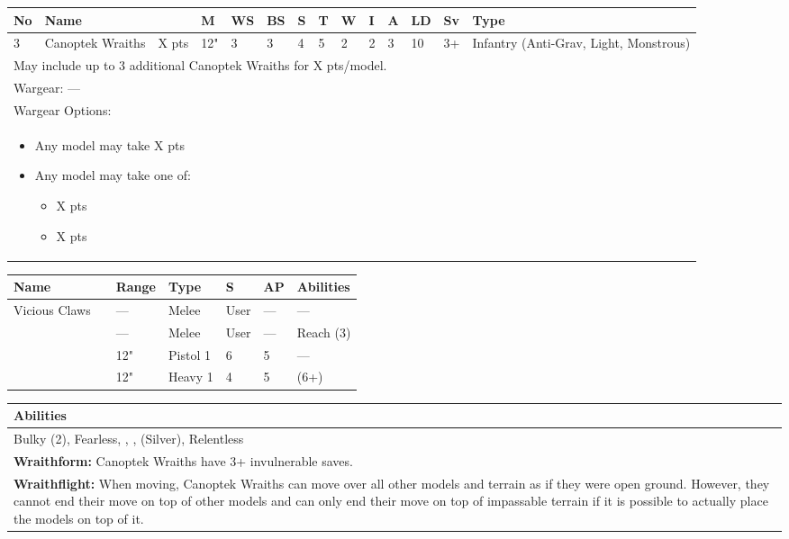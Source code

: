 \noindent
\begin{tabular}{||m{10pt} m{95pt} m{30pt} m{11pt} m{11pt} m{11pt} m{11pt} m{11pt} m{11pt} m{11pt} m{11pt} m{11pt} m{11pt} m{125pt}||}
	\hline
	No & Name & & M & WS & BS & S & T & W & I & A & LD & Sv & Type \\
	\hline
	3 & Canoptek Wraiths & X pts & 12" & 3 & 3 & 4 & 5 & 2 & 2 & 3 & 10 & 3+ & Infantry (Anti-Grav, Light, Monstrous)\\
	\hline
	\hline
	\multicolumn{14}{||Z{532 pt}||}{May include up to 3 additional Canoptek Wraiths for X pts/model.}\\		
	\hline
	\hline
	\multicolumn{14}{||Z{532 pt}||}{Wargear: —}\\
	\multicolumn{14}{||Z{532 pt}||}{Wargear Options:} \\	\multicolumn{14}{||Z{532 pt}||}{\begin{itemize}
			\item Any model may take \quickref{Whip Coils} \hrulefill X pts
			\item Any model may take one of:
			\begin{itemize}
				\item \quickref{Particle Caster} \hrulefill X pts
				\item \quickref{Transdimensional Beamer} \hrulefill X pts
			\end{itemize}
	\end{itemize}} \\
	\hline
\end{tabular}

\noindent
\begin{tabular}{||m{110pt} m{30pt} m{31pt} m{55pt} m{12pt} m{12pt} m{210pt}||}
	\hline
	Name & & Range & Type & S & AP & Abilities \\
	\hline
	Vicious Claws & & — & Melee & User & — & — \\
	\quickref{Whip Coils} & & — & Melee & User & — & Reach (3) \\
	\quickref{Particle Caster} & & 12" & Pistol 1 & 6 & 5 & — \\
	\quickref{Transdimensional Beamer} & & 12" & Heavy 1 & 4 & 5 & \quickref{Exile Ray} (6+) \\
	\hline
\end{tabular}

\noindent
\begin{tabular}{||m{532pt}||}
	\hline
	Abilities \\
	\hline
	Bulky (2), Fearless, \quickref{Living Metal}, \quickref{Reanimation Protocols}, \quickref{Soulless Hordes} (Silver), Relentless \\
	\textbf{Wraithform:} Canoptek Wraiths have 3+ invulnerable saves. \\
	\textbf{Wraithflight:} When moving, Canoptek Wraiths can move over all other models and terrain as if they were open ground. However, they cannot end their move on top of other models and can only end their move on top of impassable terrain if it is possible to actually place the models on top of it. \\
	\hline
\end{tabular}


